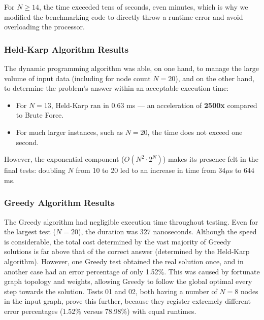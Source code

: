 For $N \ge 14$, the time exceeded tens of seconds, even minutes, which is why we modified the benchmarking code to directly throw a runtime 
error and avoid overloading the processor.

\subsubsection{Held-Karp Algorithm Results}

The dynamic programming algorithm was able, on one hand, to manage the large volume of input data (including for node count $N=20$), and on 
the other hand, to determine the problem's answer within an acceptable execution time:

\begin{itemize}
    \item For $N=13$, Held-Karp ran in $0.63$ ms — an acceleration of \textbf{2500x} compared to Brute Force.
    \item For much larger instances, such as $N=20$, the time does not exceed one second.
\end{itemize}

However, the exponential component ($O(N^2 \cdot 2^N)$) makes its presence felt in the final tests: doubling $N$ from 10 to 20 led to an 
increase in time from $34 \mu$s to $644$ ms.

\subsubsection{Greedy Algorithm Results}

The Greedy algorithm had negligible execution time throughout testing. Even for the largest test ($N=20$), the duration was $327$ nanoseconds. 
Although the speed is considerable, the total cost determined by the vast majority of Greedy solutions is far above that of the correct answer 
(determined by the Held-Karp algorithm). However, one Greedy test obtained the real solution once, and in another case had an error percentage of only 1.52\%. 
This was caused by fortunate graph topology and weights, allowing Greedy to follow the global optimal every step towards the solution. Tests 01 and 02, both 
having a number of $N=8$ nodes in the input graph, prove this further, because they register extremely different error percentages (1.52\% versus 78.98\%) with equal runtimes.
